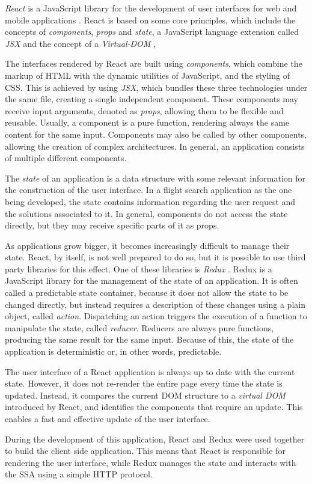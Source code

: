 \textit{React} is a JavaScript library for the development of user interfaces for web and mobile applications \cite{react}. React is based on some core principles, which include the concepts of \textit{components}, \textit{props} and \textit{state}, a JavaScript language extension called \textit{JSX} and the concept of a  \textit{Virtual-DOM} \cite{react_redux_article},

The interfaces rendered by React are built using \textit{components}, which combine the markup of HTML with the dynamic utilities of JavaScript, and the styling of CSS. This is achieved by using \textit{JSX}, which bundles these three technologies under the same file, creating a single independent component. These components may receive input arguments, denoted as \textit{props}, allowing them to be flexible and reusable. Usually, a component is a pure function, rendering always the same content for the same input. Components may also be called by other components, allowing the creation of complex architectures. In general, an application consists of multiple different components.  

The \textit{state} of an application is a data structure with some relevant information for the construction of the user interface. In a flight search application as the one being developed, the state contains information regarding the user request and the solutions associated to it. In general, components do not access the state directly, but they may receive specific parts of it as props.   

As applications grow bigger, it becomes increasingly difficult to manage their state. React, by itself, is not well prepared to do so, but it is possible to use third party libraries for this effect. One of these libraries is \textit{Redux} \cite{redux}. Redux is a JavaScript library for the management of the state of an application. It is often called a predictable state container, because it does not allow the state to be changed directly, but instead requires a description of these changes using a plain object, called \textit{action}. Dispatching an action triggers the execution of a function to manipulate the state, called \textit{reducer}. Reducers are always pure functions, producing the same result for the same input. Because of this, the state of the application is deterministic or, in other words, predictable.

The user interface of a React application is always up to date with the current state. However, it does not re-render the entire page every time the state is updated. Instead, it compares the current DOM structure to a \textit{virtual DOM} introduced by React, and identifies the components that require an update. This enables a fast and effective update of the user interface.

During the development of this application, React and Redux were used together to build the client side application. This means that React is responsible for rendering the user interface, while Redux manages the state and interacts with the SSA using a simple HTTP protocol.


